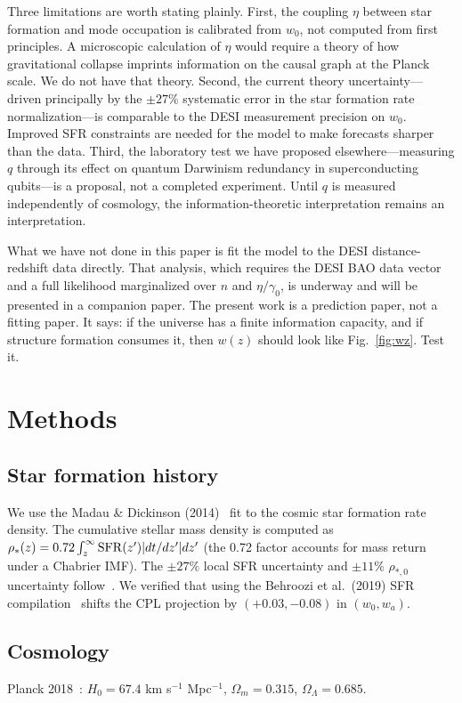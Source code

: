 \documentclass[12pt,a4paper]{article}
\begin{document}
Three limitations are worth stating plainly. First, the coupling $\eta$ between star formation and mode occupation is calibrated from $w_0$, not computed from first principles. A microscopic calculation of $\eta$ would require a theory of how gravitational collapse imprints information on the causal graph at the Planck scale. We do not have that theory. Second, the current theory uncertainty---driven principally by the $\pm27\%$ systematic error in the star formation rate normalization---is comparable to the DESI measurement precision on $w_0$. Improved SFR constraints are needed for the model to make forecasts sharper than the data. Third, the laboratory test we have proposed elsewhere---measuring $q$ through its effect on quantum Darwinism redundancy in superconducting qubits---is a proposal, not a completed experiment. Until $q$ is measured independently of cosmology, the information-theoretic interpretation remains an interpretation.

What we have not done in this paper is fit the model to the DESI distance-redshift data directly. That analysis, which requires the DESI BAO data vector and a full likelihood marginalized over $n$ and $\eta/\gamma_0$, is underway and will be presented in a companion paper. The present work is a prediction paper, not a fitting paper. It says: if the universe has a finite information capacity, and if structure formation consumes it, then $w(z)$ should look like Fig.~\ref{fig:wz}. Test it.

\section*{Methods}

\subsection*{Star formation history}
We use the Madau \& Dickinson (2014)~\cite{madau2014} fit to the cosmic star formation rate density. The cumulative stellar mass density is computed as $\rho_*(z)=0.72\int_z^\infty{\rm SFR}(z')|dt/dz'|dz'$ (the 0.72 factor accounts for mass return under a Chabrier IMF). The $\pm27\%$ local SFR uncertainty and $\pm11\%$ $\rho_{*,0}$ uncertainty follow~\cite{driver2018}. We verified that using the Behroozi et al.\ (2019) SFR compilation~\cite{behroozi2019} shifts the CPL projection by $(+0.03,-0.08)$ in $(w_0,w_a)$.

\subsection*{Cosmology}
Planck 2018~\cite{planck2018}: $H_0=67.4$ km s$^{-1}$ Mpc$^{-1}$, $\Omega_m=0.315$, $\Omega_\Lambda=0.685$.
\end{document}
